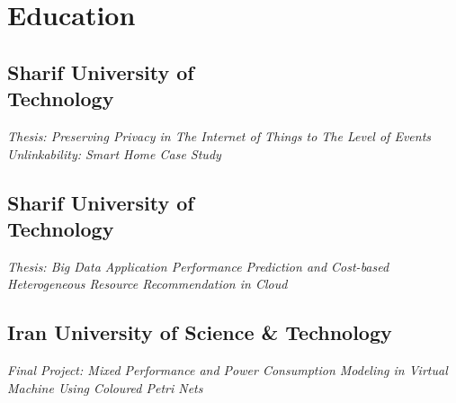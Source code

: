 \documentclass[letterpaper]{deedy-resume} %
\begin{document}
\begin{minipage}[t]{0.33\textwidth} %


\section{Education} 

\subsection{Sharif University of \\ Technology}

{\footnotesize \textit{Thesis: Preserving Privacy in The Internet of Things to The Level of Events Unlinkability: Smart Home Case Study }} \\

\sectionspace %

\subsection{Sharif University of \\ Technology}

{\footnotesize \textit{Thesis: Big Data Application Performance Prediction and Cost-based Heterogeneous Resource Recommendation in Cloud}} \\

\sectionspace %


\subsection{Iran University of Science \& Technology}

{\footnotesize \textit{Final Project: Mixed Performance and Power Consumption Modeling in Virtual Machine Using Coloured Petri Nets}} \\


\end{minipage}
\end{document}
